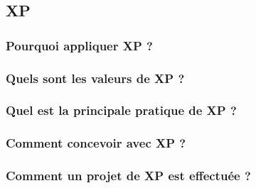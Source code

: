 \subsection{XP}


\subsubsection{Pourquoi appliquer XP ?}
\subsubsection{Quels sont les valeurs de XP ?}
\subsubsection{Quel est la principale pratique de XP ?}
\subsubsection{Comment concevoir avec XP ?}
\subsubsection{Comment un projet de XP est effectuée ?}